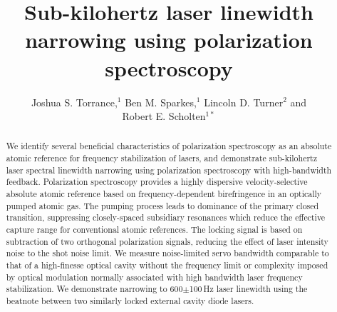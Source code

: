 \documentclass[10pt,letterpaper]{article}
\begin{document}
\title{Sub-kilohertz laser linewidth narrowing using polarization spectroscopy}

\author{Joshua S. Torrance,$^{1}$ Ben M. Sparkes,$^1$ Lincoln D. Turner$^2$ and

Robert E. Scholten$^{1*}$}

\address{$^{1}$School of Physics, The University of Melbourne, Victoria 3010 Australia}
\address{$^{2}$School of Physics and Astronomy, Monash University, Victoria 3800 Australia}



\begin{abstract}
We identify several beneficial characteristics of polarization spectroscopy as an absolute atomic reference for frequency stabilization of lasers, and demonstrate sub-kilohertz laser spectral linewidth narrowing using polarization spectroscopy with high-bandwidth feedback.
Polarization spectroscopy provides a highly dispersive velocity-selective absolute atomic reference based on frequency-dependent birefringence in an optically pumped atomic gas.
The pumping process leads to dominance of the primary closed transition, suppressing closely-spaced subsidiary resonances which reduce the effective capture range for conventional atomic references.
The locking signal is based on subtraction of two orthogonal polarization signals, reducing the effect of laser intensity noise to the shot noise limit.
We measure noise-limited servo bandwidth comparable to that of a high-finesse optical cavity without the frequency limit or complexity imposed by optical modulation normally associated with high bandwidth laser frequency stabilization.
We demonstrate narrowing to 600$\pm$100\,Hz laser linewidth using the beatnote between two similarly locked external cavity diode lasers.
\end{abstract}

\end{document}

